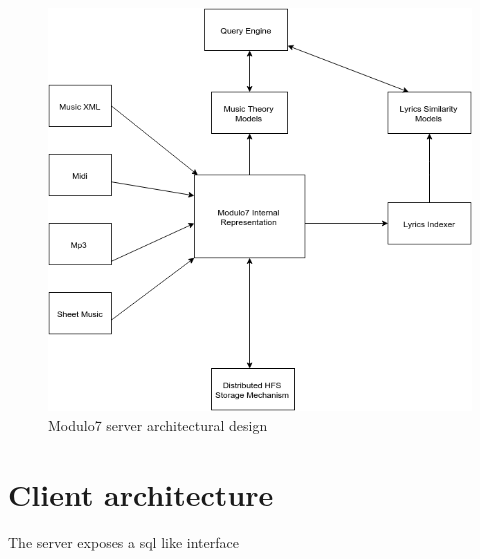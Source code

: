 \begin{figure}[t]
\centering
\includegraphics[width=\textwidth]{Modulo7ServerDesign.png}
\makeatletter
\let\@currsize\normalsize
\caption{Modulo7 server architectural design}
\label{fig:figure}
\end{figure}
\section*{Client architecture}
The server exposes a sql like interface 

